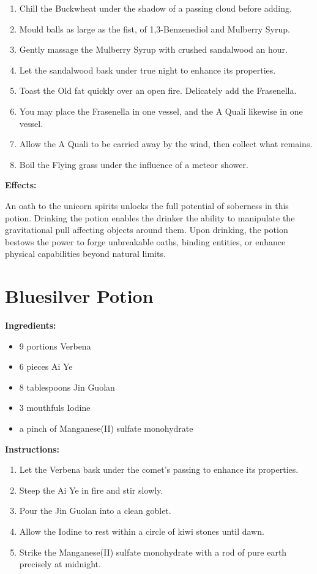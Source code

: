 \documentclass{article}
\begin{document}
\begin{enumerate}
  \item Chill the Buckwheat under the shadow of a passing cloud before adding.
  \item Mould balls as large as the fist, of 1,3-Benzenediol and Mulberry Syrup.
  \item Gently massage the Mulberry Syrup with crushed sandalwood an hour.
  \item Let the sandalwood bask under true night to enhance its properties.
  \item Toast the Old fat quickly over an open fire. Delicately add the Frasenella.
  \item You may place the Frasenella in one vessel, and the A Quali likewise in one vessel.
  \item Allow the A Quali to be carried away by the wind, then collect what remains.
  \item Boil the Flying grass under the influence of a meteor shower.
\end{enumerate}

\textbf{Effects:}

An oath to the unicorn spirits unlocks the full potential of soberness in this potion. Drinking the potion enables the drinker the ability to manipulate the gravitational pull affecting objects around them. Upon drinking, the potion bestows the power to forge unbreakable oaths, binding entities, or enhance physical capabilities beyond natural limits.

\newpage
\section*{Bluesilver Potion}

\textbf{Ingredients:}

\begin{itemize}
  \item 9 portions Verbena
  \item 6 pieces Ai Ye
  \item 8 tablespoons Jin Guolan
  \item 3 mouthfuls Iodine
  \item a pinch of Manganese(II) sulfate monohydrate
\end{itemize}

\textbf{Instructions:}

\begin{enumerate}
  \item Let the Verbena bask under the comet’s passing to enhance its properties.
  \item Steep the Ai Ye in fire and stir slowly.
  \item Pour the Jin Guolan into a clean goblet.
  \item Allow the Iodine to rest within a circle of kiwi stones until dawn.
  \item Strike the Manganese(II) sulfate monohydrate with a rod of pure earth precisely at midnight.
\end{enumerate}
\end{document}
